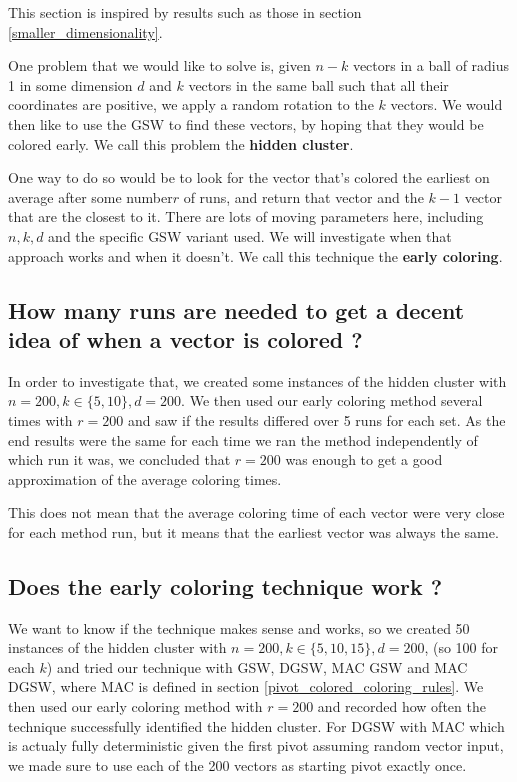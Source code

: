 \documentclass[12pt]{article}
\begin{document}
This section is inspired by results such as those in section \ref{smaller_dimensionality}.

One problem that we would like to solve is, given $n-k$ vectors in a ball of radius 1 in some dimension $d$ and $k$ vectors in the same ball such that all their coordinates are positive, we apply a random rotation to the $k$ vectors. We would then like to use the GSW to find these vectors, by hoping that they would be colored early. We call this problem the \textbf{hidden cluster}.

One way to do so would be to look for the vector that's colored the earliest on average after some number$r$ of runs, and return that vector and the $k-1$ vector that are the closest to it. There are lots of moving parameters here, including $n,k,d$ and the specific GSW variant used. We will investigate when that approach works and when it doesn't. We call this technique the \textbf{early coloring}.

\subsection{How many runs are needed to get a decent idea of when a vector is colored ?}
In order to investigate that, we created some instances of the hidden cluster with $n=200,k\in\{5,10\},d=200$. We then used our early coloring method several times with $r=200$ and saw if the results differed over 5 runs for each set. As the end results were the same for each time we ran the method independently of which run it was, we concluded that $r=200$ was enough to get a good approximation of the average coloring times. 

This does not mean that the average coloring time of each vector were very close for each method run, but it means that the earliest vector was always the same.

\subsection{Does the early coloring technique work ?}
We want to know if the technique makes sense and works, so we created 50 instances of the hidden cluster with $n=200,k\in\{5,10,15\},d=200$, (so 100 for each $k$) and tried our technique with GSW, DGSW, MAC GSW and MAC DGSW, where MAC is defined in section \ref{pivot_colored_coloring_rules}. We then used our early coloring method with $r=200$ and recorded how often the technique successfully identified the hidden cluster. For DGSW with MAC which is actualy fully deterministic given the first pivot assuming random vector input, we made sure to use each of the 200 vectors as starting pivot exactly once.
\end{document}
